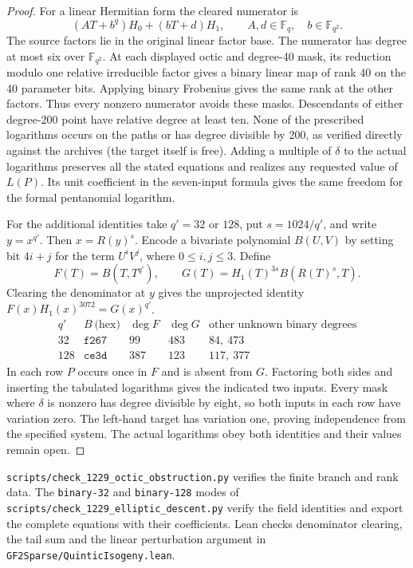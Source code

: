 \documentclass[11pt]{article}
\begin{document}
\begin{proof}
For a linear Hermitian form the cleared numerator is
\[
       (AT+b^q)H_0+(bT+d)H_1,\qquad
       A,d\in\mathbb F_q,\quad b\in\mathbb F_{q^2}.
\]
The source factors lie in the original linear factor base. The
numerator has degree at most six over \(\mathbb F_{q^2}\). At each
displayed octic and degree-40 mask, its reduction modulo one relative
irreducible factor gives a binary linear map of rank 40 on the 40
parameter bits. Applying binary Frobenius gives the same rank at the
other factors. Thus every nonzero numerator avoids these masks.
Descendants of either degree-200 point have relative degree at least
ten. None of the prescribed logarithms occurs on the paths or has
degree divisible by 200, as verified directly against the archives
(the target itself is free). Adding a multiple of \(\delta\) to the
actual logarithms preserves all the stated equations and realizes any
requested value of \(L(P)\). Its unit coefficient in the seven-input
formula gives the same freedom for the formal pentanomial logarithm.

For the additional identities take \(q'=32\) or \(128\), put
\(s=1024/q'\), and write \(y=x^{q'}\). Then \(x=R(y)^s\).
Encode a bivariate polynomial \(B(U,V)\) by setting bit \(4i+j\)
for the term \(U^iV^j\), where \(0\le i,j\le3\). Define
\[
 F(T)=B(T,T^{q'}),\qquad G(T)=H_1(T)^{3s}B(R(T)^s,T).
\]
Clearing the denominator at \(y\) gives the unprojected identity
\(F(x)H_1(x)^{3072}=G(x)^{q'}\).
\[
\begin{array}{r|c|rr|c}
 q' & B\ \text{(hex)} & \deg F & \deg G & \text{other unknown binary degrees}\\ \hline
 32  & \mathtt{f267} & 99  & 483 & 84,\ 473\\
 128 & \mathtt{ce3d} & 387 & 123 & 117,\ 377
\end{array}
\]
In each row \(P\) occurs once in \(F\) and is absent from \(G\).
Factoring both sides and inserting the tabulated logarithms gives
the indicated two inputs. Every mask where \(\delta\) is nonzero
has degree divisible by eight, so both inputs in each row have
variation zero. The left-hand target has variation one, proving
independence from the specified system. The actual logarithms obey
both identities and their values remain open.
\end{proof}
\nolinkurl{scripts/check_1229_octic_obstruction.py} verifies the
finite branch and rank data. The \texttt{binary-32} and
\texttt{binary-128} modes of
\nolinkurl{scripts/check_1229_elliptic_descent.py} verify the field
identities and export the complete equations with their coefficients.
Lean checks denominator clearing, the tail sum and the linear
perturbation argument in \nolinkurl{GF2Sparse/QuinticIsogeny.lean}.
\end{document}

